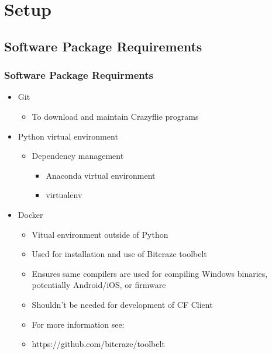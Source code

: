 \documentclass[t, xcolor=dvipsnames]{beamer}
\begin{document}
\section{Setup}
\subsection{Software Package Requirements}
\begin{frame}
	\frametitle{Software Package Requirments}
	\begin{itemize}
		\item Git
			\begin{itemize}
				\item To download and maintain Crazyflie programs
			\end{itemize}
		\item Python virtual environment
			\begin{itemize}
				\item Dependency management
			\begin{itemize}
				\item Anaconda virtual environment
				\item virtualenv
			\end{itemize}
			\end{itemize}
		\item Docker
			\begin{itemize}
				\item Vitual environment outside of Python
				\item Used for installation and use of Bitcraze toolbelt
				\item Ensures same compilers are used for compiling Windows binaries, potentially Android/iOS, or firmware
				\item Shouldn't be needed for development of CF Client
				\item For more information see:
				\item https://github.com/bitcraze/toolbelt
			\end{itemize}
	\end{itemize}
\end{frame}
\end{document}
